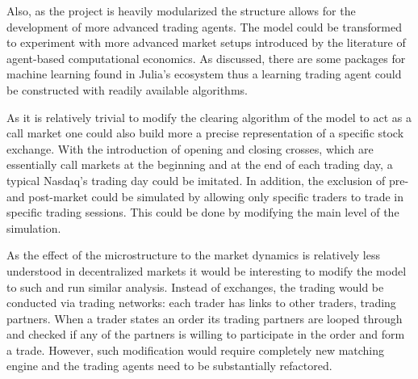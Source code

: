 Also, as the project is heavily modularized the structure allows for the development of more advanced
trading agents. The model could be transformed to experiment with more advanced
market setups introduced by the literature of agent-based computational economics. As discussed,
there are some packages for machine learning found in Julia's ecosystem thus 
a learning trading agent could be constructed with readily available algorithms.

As it is relatively trivial to modify the clearing algorithm of the model to 
act as a call market one could also build more a precise representation of a
specific stock exchange. With the introduction of opening and closing crosses,
which are essentially call markets at the beginning and at the end of each 
trading day, a typical Nasdaq's trading day could be imitated. In addition,
the exclusion of pre- and post-market could be simulated by allowing only
specific traders to trade in specific trading sessions. This could be done
by modifying the main level of the simulation. 

As the effect of the microstructure to the market dynamics is relatively 
less understood in decentralized markets it would be interesting to modify 
the model to such and run similar analysis. Instead of exchanges, the trading 
would be conducted via trading networks: each trader has links to other traders, 
trading partners. When a trader states an order its trading partners are 
looped through and checked if any of the partners is willing to participate 
in the order and form a trade. However, such modification would require 
completely new matching engine and the trading agents need to be substantially 
refactored.
